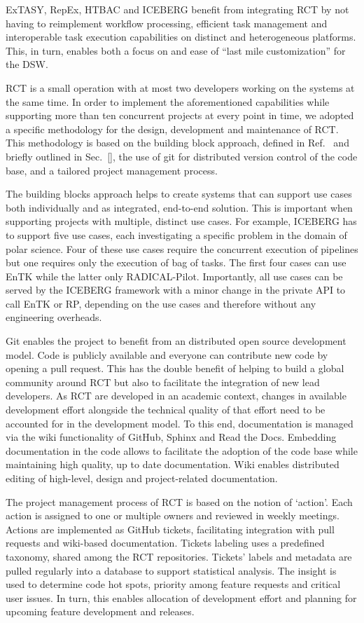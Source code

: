 \documentclass[preprint,12pt, a4paper]{elsarticle}
\begin{document}
ExTASY, RepEx, HTBAC and ICEBERG benefit from integrating RCT by not
having to reimplement workflow processing, efficient task management and
interoperable task execution capabilities on distinct and heterogeneous
platforms. This, in turn, enables both a focus on and ease of ``last mile
customization'' for the DSW\@.

RCT is a small operation with at most two developers working on the systems
at the same time. In order to implement the aforementioned capabilities while
supporting more than ten concurrent projects at every point in time, we
adopted a specific methodology for the design, development and maintenance of
RCT. This methodology is based on the building block approach, defined in
Ref.~\cite{bb} and briefly outlined in Sec.~\ref{}, the use of git for
distributed version control of the code base, and a tailored project
management process.

The building blocks approach helps to create systems that can support use
cases both individually and as integrated, end-to-end solution. This is
important when supporting projects with multiple, distinct use cases. For
example, ICEBERG has to support five use cases, each investigating a specific
problem in the domain of polar science. Four of these use cases require the
concurrent execution of pipelines but one requires only the execution of bag
of tasks. The first four cases can use EnTK while the latter only
RADICAL-Pilot. Importantly, all use cases can be served by the ICEBERG
framework with a minor change in the private API to call EnTK or RP,
depending on the use cases and therefore without any engineering overheads.

Git enables the project to benefit from an distributed open source
development model. Code is publicly available and everyone can contribute new
code by opening a pull request. This has the double benefit of helping to
build a global community around RCT but also to facilitate the integration of
new lead developers. As RCT are developed in an academic context, changes in
available development effort alongside the technical quality of that effort
need to be accounted for in the development model. To this end, documentation
is managed via the wiki functionality of GitHub, Sphinx and Read the Docs.
Embedding documentation in the code allows to facilitate the adoption of the
code base while maintaining high quality, up to date documentation. Wiki
enables distributed editing of high-level, design and project-related
documentation.

The project management process of RCT is based on the notion of `action'.
Each action is assigned to one or multiple owners and reviewed in weekly
meetings. Actions are implemented as GitHub tickets, facilitating integration
with pull requests and wiki-based documentation. Tickets labeling uses a
predefined taxonomy, shared among the RCT repositories. Tickets' labels and
metadata are pulled regularly into a database to support statistical
analysis. The insight is used to determine code hot spots, priority among
feature requests and critical user issues. In turn, this enables allocation
of development effort and planning for upcoming feature development and
releases.
\end{document}

